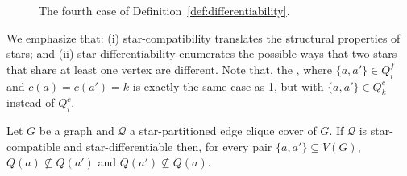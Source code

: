 \begin{figure}[!htb]
    
    
    
    \caption{The fourth case of Definition~\ref{def:differentiability}.}
    \label{fig:diff_cases2}
\end{figure}


We emphasize that: (i) star-compatibility translates the structural properties of stars; and (ii) star-differentiability enumerates the possible ways that two stars that share at least one vertex are different.
Note that, the , where $\{a,a'\} \in Q_i^f$ and $c(a) = c(a') = k$ is exactly the same case as 1, but with $\{a,a'\} \in Q_k^c$ instead of $Q_i^c$.

\begin{lemma}
    \label{lem:star_maximality}
    Let $G$ be a graph and $\mathcal{Q}$ a star-partitioned edge clique cover of $G$. If $\mathcal{Q}$ is star-compatible and star-differentiable then, for every pair $\{a, a'\} \subseteq V(G)$, $Q(a) \nsubseteq Q(a')$ and $Q(a') \nsubseteq Q(a)$.
\end{lemma}

